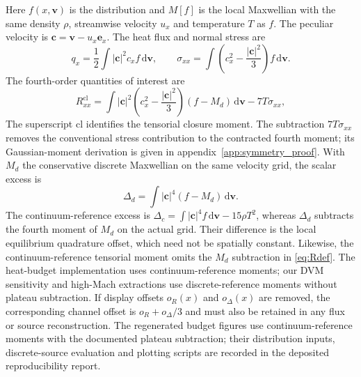 \documentclass[lineno,paper]{JFM-FLM_Au}
\newenvironment{revision}{\begingroup\colorlet{shadecolor}{revisionyellow}\begin{shaded}}{\end{shaded}\endgroup}
\newenvironment{revision}{}{}
\newcommand{\dd}{\mathrm{d}}
\newcommand{\cl}{\mathrm{cl}}
\begin{document}
\begin{revision}
Here $f(x,\boldsymbol v)$ is the distribution and $M[f]$ is the local Maxwellian with the same density $\rho$, streamwise velocity $u_x$ and temperature $T$ as $f$.  The peculiar velocity is $\boldsymbol c=\boldsymbol v-u_x\boldsymbol e_x$.  The heat flux and normal stress are
\begin{equation}
  q_x = \frac{1}{2}\int |\boldsymbol c|^2 c_x f\,\dd\boldsymbol v,
  \qquad
  \sigma_{xx}=\int \left(c_x^2-\frac{|\boldsymbol c|^2}{3}\right)f\,\dd\boldsymbol v .
  \label{eq:q_sigma}
\end{equation}
The fourth-order quantities of interest are
\begin{equation}
  R^{\cl}_{xx}
  =\int |\boldsymbol c|^2\left(c_x^2-\frac{|\boldsymbol c|^2}{3}\right)(f-M_d)\,\dd\boldsymbol v
   - 7T\sigma_{xx},
  \label{eq:Rdef}
\end{equation}
The superscript $\mathrm{cl}$ identifies the tensorial closure moment. The subtraction $7T\sigma_{xx}$ removes the conventional stress contribution to the contracted fourth moment; its Gaussian-moment derivation is given in appendix~\ref{app:symmetry_proof}. With $M_d$ the conservative discrete Maxwellian on the same velocity grid, the scalar excess is
\begin{equation}
  \Delta_d=\int |\boldsymbol c|^4(f-M_d)\,\dd\boldsymbol v .
  \label{eq:Deltadef}
\end{equation}
The continuum-reference excess is $\Delta_c=\int |\boldsymbol c|^4 f\,\dd\boldsymbol v-15\rho T^2$, whereas $\Delta_d$ subtracts the fourth moment of $M_d$ on the actual grid. Their difference is the local equilibrium quadrature offset, which need not be spatially constant. Likewise, the continuum-reference tensorial moment omits the $M_d$ subtraction in \eqref{eq:Rdef}. The heat-budget implementation uses continuum-reference moments; our DVM sensitivity and high-Mach extractions use discrete-reference moments without plateau subtraction. If display offsets $o_R(x)$ and $o_\Delta(x)$ are removed, the corresponding channel offset is $o_R+o_\Delta/3$ and must also be retained in any flux or source reconstruction. The regenerated budget figures use continuum-reference moments with the documented plateau subtraction; their distribution inputs, discrete-source evaluation and plotting scripts are recorded in the deposited reproducibility report.
\end{revision}
\end{document}
